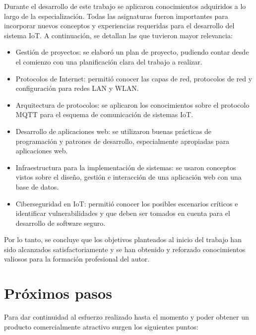 Durante el desarrollo de este trabajo se aplicaron conocimientos adquiridos a lo largo de la especialización. Todas las asignaturas fueron importantes para incorporar nuevos conceptos y experiencias requeridas para el desarrollo del sistema IoT. A continuación, se detallan las que tuvieron mayor relevancia:


\begin{itemize}
\item Gestión de proyectos: se elaboró un plan de proyecto, pudiendo contar desde el comienzo con una planificación clara del trabajo a realizar.

\item Protocolos de Internet: permitió conocer las capas de red, protocolos de red y configuración para redes LAN y WLAN. 

\item Arquitectura de protocolos: se aplicaron los conocimientos sobre el protocolo MQTT para el esquema de comunicación de sistemas IoT.

\item Desarrollo de aplicaciones web: se utilizaron buenas prácticas de programación y patrones de desarrollo, especialmente apropiadas para aplicaciones web. 

\item Infraestructura para la implementación de sistemas: se usaron conceptos vistos sobre el diseño, gestión e interacción de una aplicación web con una base de datos.

\item Ciberseguridad en IoT: permitió conocer los posibles escenarios críticos e identificar vulnerabilidades y que deben ser tomados en cuenta para el desarrollo de software seguro.

\end{itemize}

Por lo tanto, se concluye que los objetivos planteados al inicio del trabajo han sido alcanzados satisfactoriamente y se han obtenido y reforzado conocimientos valiosos para la formación profesional del autor.


\section{Próximos pasos}

Para dar continuidad al esfuerzo realizado hasta el momento y poder obtener un producto comercialmente atractivo surgen los siguientes puntos: 


